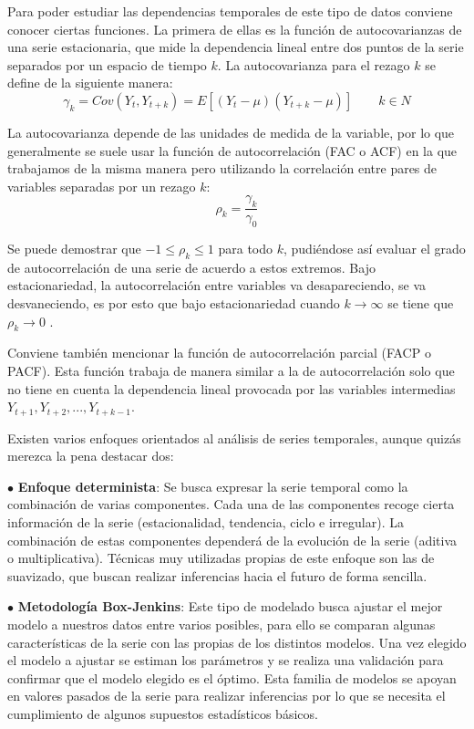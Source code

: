 Para poder estudiar las dependencias temporales de este tipo de datos conviene conocer ciertas funciones. La primera de ellas es la función de autocovarianzas de una serie estacionaria, que mide la dependencia lineal entre dos puntos de la serie separados por un espacio de tiempo $k$. La autocovarianza para el rezago $k$ se define de la siguiente manera:
\begin{equation}
    \gamma_{k}=Cov(Y_{t},Y_{t+k})=E[(Y_{t}-\mu)(Y_{t+k}-\mu)] \quad \quad k \in N
\end{equation}

La autocovarianza depende de las unidades de medida de la variable, por lo que generalmente se suele usar la función de autocorrelación (FAC o ACF) en la que trabajamos de la misma manera pero utilizando la correlación entre pares de variables separadas por un rezago $k$:
\begin{equation}
    \rho_{k}=\frac{\gamma_{k}}{\gamma_{0}}
\end{equation}

Se puede demostrar que $-1 \leq \rho_{k} \leq 1$ para todo $k$, pudiéndose así evaluar el grado de autocorrelación de una serie de acuerdo a estos extremos. Bajo estacionariedad, la autocorrelación entre variables va desapareciendo, se va desvaneciendo, es por esto que bajo estacionariedad cuando $k\rightarrow \infty$ se tiene que $\rho_{k}\rightarrow 0$ \cite{gujarati}.

Conviene también mencionar la función de autocorrelación parcial (FACP o PACF). Esta función trabaja de manera similar a la de autocorrelación solo que no tiene en cuenta la dependencia lineal provocada por las variables intermedias $Y_{t+1}, Y_{t+2},...,Y_{t+k-1}$.

Existen varios enfoques orientados al análisis de series temporales, aunque quizás merezca la pena destacar dos:

\begin{itemize*}
  \item[$\bullet$] \textbf{Enfoque determinista}: Se busca expresar la serie temporal como la combinación de varias componentes. Cada una de las componentes recoge cierta información de la serie (estacionalidad, tendencia, ciclo e irregular). La combinación de estas componentes dependerá de la evolución de la serie (aditiva o multiplicativa). Técnicas muy utilizadas propias de este enfoque son las de suavizado, que buscan realizar inferencias hacia el futuro de forma sencilla.
  \item[$\bullet$] \textbf{Metodología Box-Jenkins}: Este tipo de modelado busca ajustar el mejor modelo a nuestros datos entre varios posibles, para ello se comparan algunas características de la serie con las propias de los distintos modelos. Una vez elegido el modelo a ajustar se estiman los parámetros y se realiza una validación para confirmar que el modelo elegido es el óptimo. Esta familia de modelos se apoyan en valores pasados de la serie para realizar inferencias por lo que se necesita el cumplimiento de algunos supuestos estadísticos básicos.
\end{itemize*}



